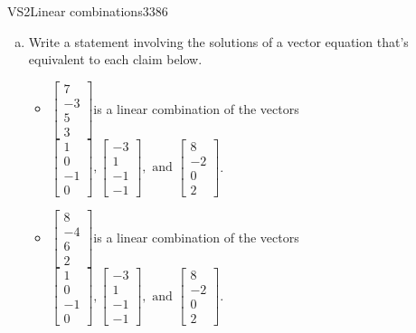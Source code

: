 \begin{exercise}{VS2}{Linear combinations}{3386} 
\begin{exerciseStatement} 

\begin{enumerate}[(a)]
\item  

 Write a statement involving the solutions of a vector equation that's equivalent to each claim below. 

 

\begin{itemize}
\item  

 \(\left[\begin{array}{c}
7 \\
-3 \\
5 \\
3
\end{array}\right]\)is a linear combination of the vectors \(\left[\begin{array}{c}
1 \\
0 \\
-1 \\
0
\end{array}\right] , \left[\begin{array}{c}
-3 \\
1 \\
-1 \\
-1
\end{array}\right] , \text{ and } \left[\begin{array}{c}
8 \\
-2 \\
0 \\
2
\end{array}\right]\). 

 
\item  

 \(\left[\begin{array}{c}
8 \\
-4 \\
6 \\
2
\end{array}\right]\)is a linear combination of the vectors \(\left[\begin{array}{c}
1 \\
0 \\
-1 \\
0
\end{array}\right] , \left[\begin{array}{c}
-3 \\
1 \\
-1 \\
-1
\end{array}\right] , \text{ and } \left[\begin{array}{c}
8 \\
-2 \\
0 \\
2
\end{array}\right]\). 


\end{itemize}
\end{enumerate}
\end{exerciseStatement}
\end{exercise}
